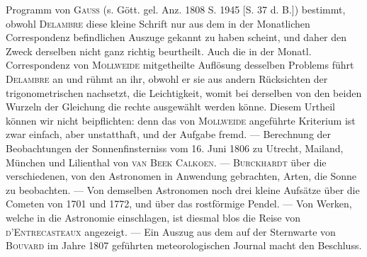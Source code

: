 Programm von \textsc{Gauss} (s. Gött. gel. Anz. 1808 S. 1945 [S. 37 d. B.]) bestimmt, obwohl \textsc{Delambre} diese kleine Schrift nur aus dem in der Monatlichen Correspondenz befindlichen Auszuge gekannt zu haben scheint, und daher den Zweck derselben nicht ganz richtig beurtheilt. Auch die in der Monatl. Correspondenz von \textsc{Mollweide} mitgetheilte Auflösung desselben Problems führt \textsc{Delambre} an und rühmt an ihr, obwohl er sie aus andern Rücksichten der trigonometrischen nachsetzt, die Leichtigkeit, womit bei derselben von den beiden Wurzeln der Gleichung die rechte ausgewählt werden könne. Diesem Urtheil können wir nicht beipflichten: denn das von \textsc{Mollweide} angeführte Kriterium ist zwar einfach, aber unstatthaft, und der Aufgabe fremd. — Berechnung der Beobachtungen der Sonnenfinsterniss vom 16. Juni 1806 zu Utrecht, Mailand, München und Lilienthal von \textsc{van Beek Calkoen}. — \textsc{Burckhardt} über die verschiedenen, von den Astronomen in Anwendung gebrachten, Arten, die Sonne zu beobachten. — Von demselben Astronomen noch drei kleine Aufsätze über die Cometen von 1701 und 1772, und über das rostförmige Pendel. — Von Werken, welche in die Astronomie einschlagen, ist diesmal blos die Reise von \textsc{d'Entrecasteaux} angezeigt. — Ein Auszug aus dem auf der Sternwarte von \textsc{Bouvard} im Jahre 1807 geführten meteorologischen Journal macht den Beschluss.
